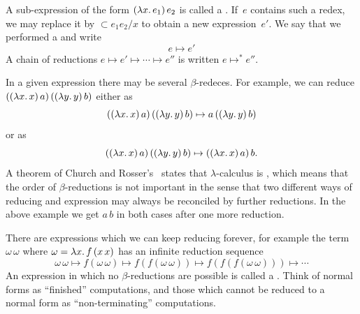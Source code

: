 A sub-expression of the form $(\lambda x .\,e_1)\, e_2$ is called a .
If~$e$ contains such a redex, we may replace it by $\subset{e_1}{e_2/x}$ to obtain a new expression~$e'$. We say that we performed a  and write
%
\begin{equation*}
  e \mapsto e'
\end{equation*}
%
A chain of reductions $e \mapsto e' \mapsto \cdots \mapsto e''$ is written $e \mapsto^* e''$.

In a given expression there may be several $\beta$-redeces. For example, we can reduce
$((\lambda x .\,x)\, a)\,((\lambda y .\,y)\,b)$ either as
%
\begin{equation*}
  ((\lambda x .\,x)\, a)\,((\lambda y .\,y)\,b) \mapsto a\, ((\lambda y .\,y)\,b)
\end{equation*}
%
or as
%
\begin{equation*}
  ((\lambda x .\,x)\, a)\,((\lambda y .\,y)\,b) \mapsto ((\lambda x .\,x)\, a)\, b.
\end{equation*}
%
A theorem of Church and Rosser's~ states that
$\lambda$-calculus is , which means that the order of
$\beta$-reductions is not important in the sense that two different ways of
reducing and expression may always be reconciled by further reductions.
In the above example we get $a\,b$ in both cases after one more reduction.

There are expressions which we can keep reducing forever, for example
the term $\omega\,\omega$ where $\omega = \lambda x .\,f\,(x\,x)$ has an
infinite reduction sequence
%
\begin{equation*}
  \omega\, \omega \mapsto
  f(\omega\, \omega) \mapsto 
  f(f(\omega\, \omega)) \mapsto 
  f(f(f(\omega\, \omega))) \mapsto
  \cdots
\end{equation*}
%
An expression in which no $\beta$-reductions are possible is called a
. Think of normal forms as ``finished''
computations, and those which cannot be reduced to a normal form as
``non-terminating'' computations.

